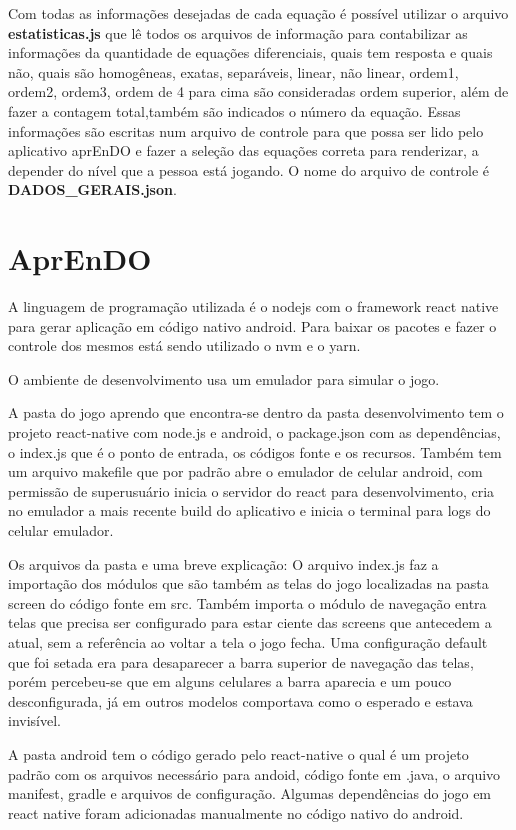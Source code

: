 Com todas as informações desejadas de cada equação é possível utilizar o arquivo \textbf{estatisticas.js} que lê todos os arquivos de informação para contabilizar as informações da quantidade de equações diferenciais, quais tem resposta e quais não, quais são homogêneas, exatas, separáveis, linear, não linear, ordem1, ordem2, ordem3, ordem de 4 para cima são consideradas ordem superior, além de fazer a contagem total,também são indicados o número da equação. Essas informações são escritas num arquivo de controle para que possa ser lido pelo aplicativo aprEnDO e fazer a seleção das equações correta para renderizar, a depender do nível que a pessoa está jogando. O nome do arquivo de controle é \textbf{DADOS\_GERAIS.json}.


\section[AprEnDO]{AprEnDO}

A linguagem de programação utilizada é o nodejs com o framework react native para gerar aplicação em código nativo android. Para baixar os pacotes e fazer o controle dos mesmos está sendo utilizado o nvm e o yarn.

O ambiente de desenvolvimento usa um emulador para simular o jogo.

A pasta do jogo aprendo que encontra-se dentro da pasta desenvolvimento tem o projeto react-native com node.js e android, o package.json com as dependências, o index.js que é o ponto de entrada, os códigos fonte e os recursos. Também tem um arquivo makefile que por padrão abre o emulador de celular android, com permissão de superusuário inicia o servidor do react para desenvolvimento, cria no emulador a mais recente build do aplicativo e inicia o terminal para logs do celular emulador.

Os arquivos da pasta e uma breve explicação:
O arquivo index.js faz a importação dos módulos que são também as telas do jogo localizadas na pasta screen do código fonte em src. Também importa o módulo de navegação entra telas que precisa ser configurado para estar ciente das screens que antecedem a atual, sem a referência ao voltar a tela o jogo fecha. Uma configuração default que foi setada era para desaparecer a barra superior de navegação das telas, porém percebeu-se que em alguns celulares a barra aparecia e um pouco desconfigurada, já em outros modelos comportava como o esperado e estava invisível. 

A pasta android tem o código gerado pelo react-native o qual é um projeto padrão com os arquivos necessário para andoid, código fonte em .java, o arquivo manifest, gradle e arquivos de configuração. Algumas dependências do jogo em react native foram adicionadas manualmente no código nativo do android.

